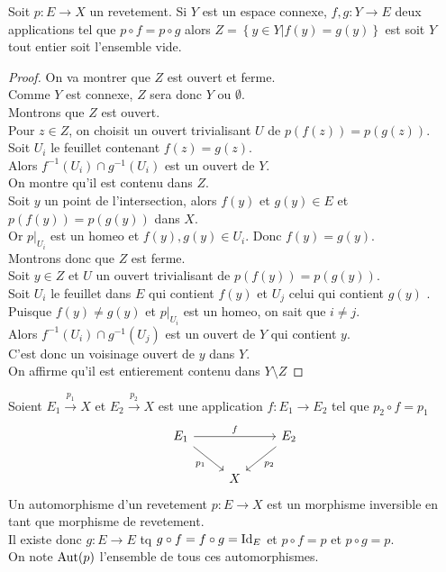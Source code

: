 \documentclass[../main.tex]{subfiles}
\begin{document}
\begin{propo}
Soit $p: E\to X$ un revetement. Si $Y$ est un espace connexe, $f,g: Y \to E$ deux applications tel que $p\circ f = p\circ g$ alors $Z= \left\{ y\in Y | f( y ) = g( y)  \right\} $ est soit $Y$ tout entier soit l'ensemble vide.
\end{propo}
\begin{proof}
On va montrer que $Z$ est ouvert et ferme.\\
Comme $Y$ est connexe, $Z$ sera donc $Y$ ou $\emptyset$.\\
Montrons que $Z$ est ouvert.\\
Pour $z\in Z$, on choisit un ouvert trivialisant $U$ de $p( f( z) ) = p( g( z) ) $.\\
Soit $U_i$ le feuillet contenant $f( z) = g(z ) $.\\
Alors $f^{-1}( U_i)\cap g^{-1}( U_i)  $ est un ouvert de $Y$.\\
On montre qu'il est contenu dans $Z$.\\
Soit $y$ un point de l'intersection, alors $f( y) $ et $g( y) \in E	$ et $p( f( y) ) = p( g( y) ) $ dans $X$.\\
Or $p|_{U_i} $ est un homeo et $f( y) , g( y) \in U_i$. Donc $f( y) = g( y) $.\\
Montrons donc que $Z$ est ferme.\\
Soit $y\in Z$ 	et $U$ un ouvert trivialisant de $p( f( y) ) = p( g( y) ) $.\\
Soit $U_i$ le feuillet dans $E$ qui contient $f( y) $ et $U_j$ celui qui contient $g( y) $ .\\
Puisque $f( y) \neq g( y) $ et $p|_{U_i} $ est un homeo, on sait que $i \neq j$.\\
Alors $f^{-1}( U_i) \cap g^{-1}( U_j) $ est un ouvert de $Y$ qui contient $y$.\\
C'est donc un voisinage ouvert de $y$ dans $Y$.\\
On affirme qu'il est entierement contenu dans $Y\setminus Z$ 
\end{proof}
\begin{defn}
	Soient $E_1 \xrightarrow{p_1} X$ et $E_2 \xrightarrow{p_2} X$ est une application $f: E_1\to E_2$ tel que
	$p_2 \circ f = p_1$
	\[\begin{tikzcd}
	{E_1} & {} & {E_2} \\
	& X
	\arrow["f", from=1-1, to=1-3]
	\arrow["{p_1}"', from=1-1, to=2-2]
	\arrow["{p_2}", from=1-3, to=2-2]
\end{tikzcd}\]
Un automorphisme d'un revetement $p:E\to X$ est un morphisme inversible en tant que morphisme de revetement.\\
Il existe donc $g: E\to E$ tq $g\circ f = f\circ g = \operatorname{Id}_E$ et $p\circ f = p$ et $p\circ g = p$.\\
On note $\operatorname{Aut} ( p) $ l'ensemble de tous ces automorphismes.
\end{defn}
\end{document}
